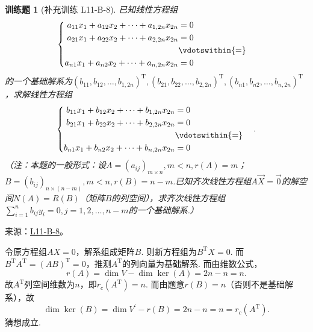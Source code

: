 \documentclass[UTF8,12pt,a4paper,fontset=fandol]{ctexart}
\newtheorem{exercise}{训练题}[section]
\begin{document}
\begin{exercise}[补充训练 L11-B-8]\label{prob:L11-B-8}
已知线性方程组
        \[\begin{cases} \begin{aligned}
                    a_{11}x_1+a_{12}x_2+\cdots+a_{1,2n}x_{2n} & =0              \\
                    a_{21}x_1+a_{22}x_2+\cdots+a_{2,2n}x_{2n} & =0              \\
                                                              & \vdotswithin{=} \\
                    a_{n1}x_1+a_{n2}x_2+\cdots+a_{n,2n}x_{2n} & =0              \\
                \end{aligned}\end{cases}\]
        的一个基础解系为$(b_{11},b_{12},\ldots,b_{1,2n})^\mathrm{T},(b_{21},b_{22},\ldots,b_{2,2n})^\mathrm{T},(b_{n1},b_{n2},\ldots,b_{n,2n})^\mathrm{T}$，求解线性方程组
        \[\begin{cases} \begin{aligned}
                    b_{11}x_1+b_{12}x_2+\cdots+b_{1,2n}x_{2n} & =0              \\
                    b_{21}x_1+b_{22}x_2+\cdots+b_{2,2n}x_{2n} & =0              \\
                                                              & \vdotswithin{=} \\
                    b_{n1}x_1+b_{n2}x_2+\cdots+b_{n,2n}x_{2n} & =0              \\
                \end{aligned} \end{cases}.\]
        （注：本题的一般形式：设$A=(a_{ij})_{m\times n},m<n,r(A)=m$；$B=(b_{ij})_{n\times(n-m)},m<n,r(B)=n-m$.已知齐次线性方程组$A\vec{X}=\vec{0}$的解空间$N(A)=R(B)$（矩阵$B$的列空间），求齐次线性方程组$\displaystyle\sum_{i=1}^{n}b_{ij}y_i=0,j=1,2,\ldots,n-m$的一个基础解系.）
\end{exercise}
\noindent 来源：\href{https://github.com/yhwu-is/Linear-Algebra-Left-Undone/blob/new/%E8%AE%B2%E4%B9%89/%E4%B8%93%E9%A2%98/11%20%E6%9C%9D%E8%8A%B1%E5%A4%95%E6%8B%BE.tex}{L11-B-8}。
\begin{solve}
令原方程组$AX=0$，解系组成矩阵$B$. 则新方程组为$B^\mathrm{T}X=0$. 而$B^\mathrm{T}A^\mathrm{T}=(AB)^\mathrm{T}=0$，推测$A^\mathrm{T}$的列向量为基础解系. 而由维数公式，
          \[ r(A)=\dim V-\dim\ker(A) = 2n-n=n. \]
          故$A^\mathrm{T}$列空间维数为$n$，即$r_c(A^\mathrm{T})=n$. 而由题意$r(B)=n$（否则不是基础解系），故
          \[ \dim{\ker(B)}=\dim{V^{\prime}}-r(B)=2n-n=n=r_c(A^\mathrm{T}). \]
          猜想成立.
\end{solve}
\end{document}
